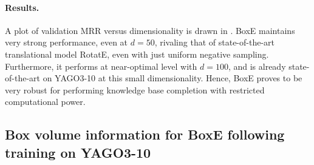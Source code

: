 \documentclass{article}
\begin{document}
\paragraph{Results.} A plot of validation MRR versus dimensionality is drawn in . BoxE maintains very strong performance, even at $d=50$, rivaling that of state-of-the-art translational model RotatE, even with just uniform negative sampling. Furthermore, it performs at near-optimal level with $d=100$, and is already state-of-the-art on YAGO3-10 at this small dimensionality. Hence, BoxE proves to be very robust for performing knowledge base completion with restricted computational power. 

\subsection{Box volume information for BoxE following training on YAGO3-10}
\label{app:YAGOVolumes}
\end{document}
